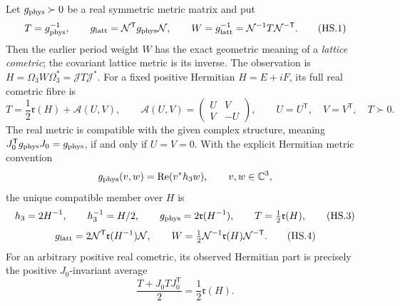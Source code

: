 \begin{theorem}
\label{q444:hermitian-cometric}
Let $g_{\rm phys}\succ0$ be a real symmetric metric matrix and put
\[
 T=g_{\rm phys}^{-1},\qquad
 g_{\rm latt}=\mathcal N^{\mathsf T}g_{\rm phys}\mathcal N,\qquad
 W=g_{\rm latt}^{-1}=\mathcal N^{-1}T\mathcal N^{-\mathsf T}.
                                                               \tag{HS.1}
\]
Then the earlier period weight $W$ has the exact geometric meaning of a
\emph{lattice cometric}; the covariant lattice metric is its inverse.
The observation is $H=\Omega_3W\Omega_3^*=\mathcal JT\mathcal J^*$.
For a fixed positive Hermitian $H=E+iF$, its full real cometric fibre is
\[
 T=\frac12\mathfrak r(H)+
       \mathcal A(U,V),\qquad
 \mathcal A(U,V)=\begin{pmatrix}U&V\\V&-U\end{pmatrix},\qquad
 U=U^{\mathsf T},\quad V=V^{\mathsf T},\quad T\succ0.              \tag{HS.2}
\]
The real metric is compatible with the given complex structure, meaning
$J_0^{\mathsf T}g_{\rm phys}J_0=g_{\rm phys}$, if and only if
$U=V=0$. With the explicit Hermitian metric convention
\[
 g_{\rm phys}(v,w)=\operatorname{Re}(v^*h_3w),
       \qquad v,w\in\mathbb C^3,
\]
the unique compatible member over $H$ is
\[
 h_3=2H^{-1},\qquad h_3^{-1}=H/2,\qquad
 g_{\rm phys}=2\mathfrak r(H^{-1}),\qquad
 T=\tfrac12\mathfrak r(H),                                    \tag{HS.3}
\]
\[
 g_{\rm latt}=2\mathcal N^{\mathsf T}
                    \mathfrak r(H^{-1})\mathcal N,\qquad
 W=\tfrac12\mathcal N^{-1}\mathfrak r(H)\mathcal N^{-\mathsf T}.
                                                               \tag{HS.4}
\]
For an arbitrary positive real cometric, its observed Hermitian part is
precisely the positive $J_0$-invariant average
\[
 \frac{T+J_0TJ_0^{\mathsf T}}2=\frac12\mathfrak r(H).             \tag{HS.5}
\]
\end{theorem}
